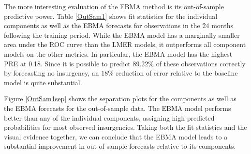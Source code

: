 \documentclass[pdftex,12pt,fullpage,oneside]{amsart}
\begin{document}
The more interesting evaluation of the EBMA method is its
out-of-sample predictive power. Table \ref{OutSam1} shows fit
statistics for the individual components as well as the EBMA forecasts
for observations in the 24 months following the training period.
While the EBMA model has a marginally smaller area under the ROC curve
than the LMER models, it outperforms all component models on the other
metrics. In particular, the EBMA model has the highest PRE at 0.18.
Since it is possible to predict 89.22\% of these observations
correctly by forecasting no insurgency, an 18\% reduction of error
relative to the baseline model is quite substantial.




Figure \ref{OutSam1sep} shows the separation plots for the components
as well as the EBMA forecasts for the out-of-sample data.  The EBMA
model performs better than any of the individual components, assigning
high predicted probabilities for most observed insurgencies.  Taking
both the fit statistics and the visual evidence together, we can
conclude that the EBMA model leads to a substantial improvement in
out-of-sample forecasts relative to its components.
\end{document}
